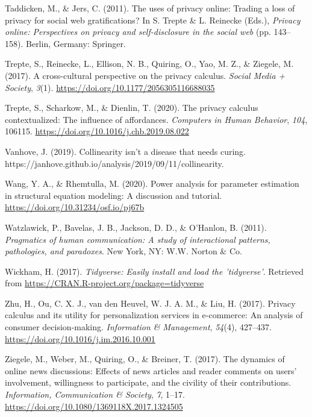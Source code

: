 \documentclass[
  english,
  man,floatsintext]{apa6}
\begin{document}
\leavevmode\hypertarget{ref-taddickenUsesPrivacyOnline2011}{}%
Taddicken, M., \& Jers, C. (2011). The uses of privacy online: Trading a loss of privacy for social web gratifications? In S. Trepte \& L. Reinecke (Eds.), \emph{Privacy online: Perspectives on privacy and self-disclosure in the social web} (pp. 143--158). Berlin, Germany: Springer.

\leavevmode\hypertarget{ref-trepteCrossculturalPerspectivePrivacy2017}{}%
Trepte, S., Reinecke, L., Ellison, N. B., Quiring, O., Yao, M. Z., \& Ziegele, M. (2017). A cross-cultural perspective on the privacy calculus. \emph{Social Media + Society}, \emph{3}(1). \url{https://doi.org/10.1177/2056305116688035}

\leavevmode\hypertarget{ref-treptePrivacyCalculusContextualized2020}{}%
Trepte, S., Scharkow, M., \& Dienlin, T. (2020). The privacy calculus contextualized: The influence of affordances. \emph{Computers in Human Behavior}, \emph{104}, 106115. \url{https://doi.org/10.1016/j.chb.2019.08.022}

\leavevmode\hypertarget{ref-vanhoveCollinearityIsnDisease2019}{}%
Vanhove, J. (2019). Collinearity isn't a disease that needs curing. https://janhove.github.io/analysis/2019/09/11/collinearity.

\leavevmode\hypertarget{ref-wangPowerAnalysisParameter2020}{}%
Wang, Y. A., \& Rhemtulla, M. (2020). Power analysis for parameter estimation in structural equation modeling: A discussion and tutorial. \url{https://doi.org/10.31234/osf.io/pj67b}

\leavevmode\hypertarget{ref-watzlawickPragmaticsHumanCommunication2011}{}%
Watzlawick, P., Bavelas, J. B., Jackson, D. D., \& O'Hanlon, B. (2011). \emph{Pragmatics of human communication: A study of interactional patterns, pathologies, and paradoxes}. New York, NY: W.W. Norton \& Co.

\leavevmode\hypertarget{ref-R-tidyverse}{}%
Wickham, H. (2017). \emph{Tidyverse: Easily install and load the 'tidyverse'}. Retrieved from \url{https://CRAN.R-project.org/package=tidyverse}

\leavevmode\hypertarget{ref-zhuPrivacyCalculusIts2017}{}%
Zhu, H., Ou, C. X. J., van den Heuvel, W. J. A. M., \& Liu, H. (2017). Privacy calculus and its utility for personalization services in e-commerce: An analysis of consumer decision-making. \emph{Information \& Management}, \emph{54}(4), 427--437. \url{https://doi.org/10.1016/j.im.2016.10.001}

\leavevmode\hypertarget{ref-ziegeleDynamicsOnlineNews2017}{}%
Ziegele, M., Weber, M., Quiring, O., \& Breiner, T. (2017). The dynamics of online news discussions: Effects of news articles and reader comments on users' involvement, willingness to participate, and the civility of their contributions. \emph{Information, Communication \& Society}, \emph{7}, 1--17. \url{https://doi.org/10.1080/1369118X.2017.1324505}
\end{document}
